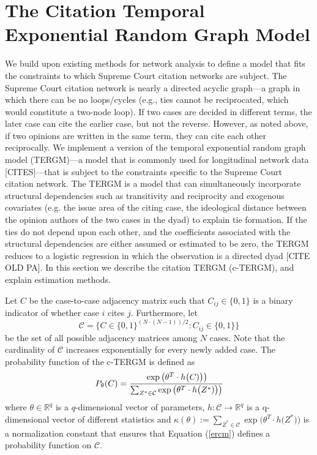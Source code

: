 \documentclass[headsepline=true, abstracton]{scrartcl}
\begin{document}
 \section{The Citation Temporal Exponential Random Graph Model}
We build upon existing methods for network analysis to define a model that fits the constraints to which Supreme Court citation networks are subject. The Supreme Court citation network is nearly a directed acyclic graph---a graph in which there can be no loops/cycles (e.g., ties cannot be reciprocated, which would constitute a two-node loop). If two cases are decided in different terms, the later case can cite the earlier case, but not the reverse. However, as noted above, if two opinions are written in the same term, they can cite each other reciprocally. We implement a version of the temporal exponential random graph model (TERGM)---a model that is commonly used for longitudinal network data [CITES]---that is subject to the constraints specific to the Supreme Court citation network. The TERGM is a model that can simultaneously incorporate structural dependencies such as transitivity and reciprocity and exogenous covariates  (e.g. the issue area of the citing case, the ideological distance between the opinion authors of the two cases in the dyad) to explain tie formation. If the ties do not depend upon each other, and the coefficients associated with the structural dependencies are either assumed or estimated to be zero, the TERGM reduces to a logistic regression in which the observation is a directed dyad [CITE OLD PA].  In this section we describe the citation TERGM (c-TERGM), and explain estimation methods. 

Let $C$ be the case-to-case adjacency matrix such that $C_{ij} \in \{0,1\}$ is a binary indicator of whether case $i$ cites $j$. Furthermore, let
$$\mathcal{C} =\{C \in \{0,1\}^{(N \cdot (N-1))/2}: C_{ij} \in \{0,1\} \}$$ 
be the set of all possible adjacency matrices among $N$ cases. Note that the cardinality of $\mathcal{C}$ increases exponentially for every newly added case. The probability function of the c-TERGM  is defined as
\begin{equation}
P_{\theta}(C)=\cfrac{\exp\big(\theta^T\cdot h\big(C)\big)\big)}{\sum_{Z^*\in \mathcal{C}}\exp\big(\theta^T\cdot h\big(Z^*)\big)\big)}
\label{ercm}
\end{equation}
where $\theta \in \mathbb{R}^q$ is a $q$-dimensional vector of parameters,  $h: \mathcal{C} \to \mathbb{R}^q$ is a q-dimensional vector of different statistics and $\kappa(\theta) := \sum_{Z^*\in \mathcal{C}}\exp\big(\theta^T\cdot h\big(Z^*)\big)$ is a normalization constant that ensures that Equation (\ref{ercm}) defines a probability function on $\mathcal{C}$.
\end{document}
